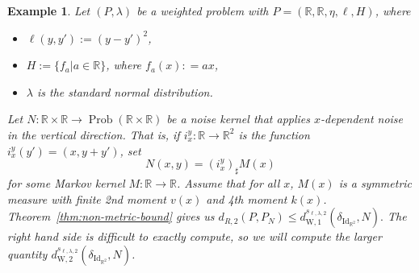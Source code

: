 \documentclass[twoside,11pt]{article}
\newtheorem{examples}[theorem]{Example}
\DeclareMathOperator{\prob}{Prob}
\DeclareMathOperator{\id}{Id}
\newcommand{\dWkernp}[1]{d_{\mathrm{W},#1}}
\newcommand{\dWkern}{\dWkernp{1}}
\begin{document}
\begin{examples} 
    Let $(P,\lambda)$ be a weighted problem with $P = (\mathbb R, \mathbb R, \eta, \ell, H)$, where
    \begin{itemize}
        \item $\ell(y,y') := (y-y')^2$,
        \item $H := \{f_a|a\in \mathbb R\}$, where $f_a(x): = ax$,
        \item $\lambda$ is the standard normal distribution.
    \end{itemize}
    Let $N:\mathbb R\times \mathbb R \to \prob(\mathbb R\times \mathbb R)$ be a noise kernel that applies $x$-dependent noise in the vertical direction. That is, if $i_x^y:\mathbb R \to \mathbb R^2$ is the function $i_x^y(y') = (x,y+y')$, set
    \[N(x,y) = (i_x^y)_\sharp M(x)\]
    for some Markov kernel $M:\mathbb R \to \mathbb R$. Assume that for all $x$, $M(x)$ is a symmetric measure with finite 2nd moment $v(x)$ and 4th moment $k(x)$.
    Theorem~\ref{thm:non-metric-bound} gives us $d_{R,2}(P,P_N) \leq \dWkern^{s_{\ell,\lambda,2}}(\delta_{\id_{\mathbb R^2}}, N).$ The right hand side is difficult to exactly compute, so we will compute the larger quantity $\dWkernp{2}^{s_{\ell,\lambda,2}}(\delta_{\id_{\mathbb R^2}},N)$.


\end{examples}
\end{document}
